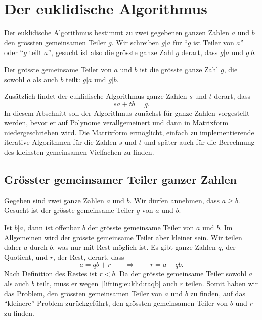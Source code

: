 %
%
%
\section{Der euklidische Algorithmus
\label{buch:section:euklid}}
Der euklidische Algorithmus bestimmt zu zwei gegebenen ganzen
Zahlen $a$ und $b$ den grössten gemeinsamen Teiler $g$.
Wir schreiben $g|a$ für ``$g$ ist Teiler von $a$'' oder ``$g$ teilt $a$'',
gesucht ist also die grösste ganze Zahl $g$ derart, dass $g|a$ und $g|b$.

\begin{definition}
\label{buch:endliche-koerper:def:ggt}
Der grösste gemeinsame Teiler von $a$ und $b$ ist die grösste
ganze Zahl $g$, die sowohl $a$ als auch $b$ teilt: $g|a$ und
$g|b$.
%
%
\end{definition}

Zusätzlich findet der euklidische Algorithmus  ganze Zahlen $s$
%
und $t$ derart, dass
\[
sa + tb = g.
\]
In diesem Abschnitt soll der Algorithmus zunächst für ganze Zahlen
vorgestellt werden, bevor er auf Polynome verallgemeinert und dann
in Matrixform niedergeschrieben wird.
Die Matrixform ermöglicht, einfach zu implementierende iterative
Algorithmen für die Zahlen $s$ und $t$ und später auch für die
Berechnung des kleinsten gemeinsamen Vielfachen zu finden.

%
%
\subsection{Grösster gemeinsamer Teiler ganzer Zahlen}
Gegeben sind zwei ganze Zahlen $a$ und $b$.
Wir dürfen annehmen, dass $a\ge b$.
Gesucht ist der grösste gemeinsame Teiler $g$ von $a$ und $b$.

Ist $b|a$, dann ist offenbar $b$ der grösste gemeinsame Teiler von $a$
und $b$.
Im Allgemeinen wird der grösste gemeinsame Teiler aber kleiner sein.
Wir teilen daher $a$ durch $b$, was nur mit Rest möglich ist.
Es gibt ganze Zahlen $q$, der Quotient, und $r$, der Rest, derart, dass
\begin{equation}
a = qb+ r
\qquad \Rightarrow \qquad
r = a - qb.
\label{lifting:euklid:raqb}
\end{equation}
Nach Definition des Restes ist $r < b$.
Da der grösste gemeinsame Teiler sowohl $a$ als auch $b$ teilt, muss er
wegen~\eqref{lifting:euklid:raqb} auch $r$ teilen.
Somit haben wir das Problem, den grössten gemeinsamen Teiler von $a$ und
$b$ zu finden, auf das ``kleinere'' Problem zurückgeführt, den grössten
gemeinsamen Teiler von $b$ und $r$ zu finden.


